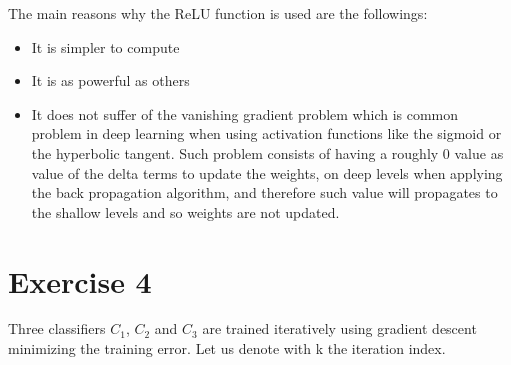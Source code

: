 \documentclass[a4paper,11pt,oneside]{book}
\begin{document}
        \begin{solution}
            The main reasons why the ReLU function is used are the followings:
            
            \begin{itemize}
            \item It is simpler to compute
            
            \item It is as powerful as others
            
            \item It does not suffer of the vanishing gradient problem which is common problem in deep learning when using activation functions like the sigmoid or the hyperbolic tangent. Such problem consists of having a roughly 0 value as value of the delta terms to update the weights, on deep levels when applying the back propagation algorithm, and therefore such value will propagates to the shallow levels and so weights are not updated.
            \end{itemize}
        \end{solution}

\clearpage
\section{Exercise 4}
    Three classifiers $C_1$, $C_2$ and $C_3$ are trained iteratively using gradient descent minimizing the training error. Let us denote with k the iteration index.
\end{document}

